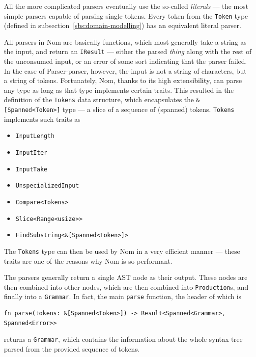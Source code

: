 \documentclass[english,engineering]{wizthesis}
\newcommand{\thisproject}{Parser-parser}
\begin{document}
All the more complicated parsers eventually use the so-called \emph{literals}
--- the most simple parsers capable of parsing single tokens. Every token from
the \texttt{Token} type (defined in subsection~\ref{sbs:domain-modelling}) has
an equivalent literal parser.

All parsers in Nom are basically functions, which most generally take a string
as the input, and return an \texttt{IResult} --- either the parsed \emph{thing}
along with the rest of the unconsumed input, or an error of some sort indicating
that the parser failed. In the case of \thisproject{}, however, the input is not
a string of characters, but a string of tokens. Fortunately, Nom, thanks to its
high extensibility, can parse any type as long as that type implements certain
traits. This resulted in the definition of the \texttt{Tokens} data structure,
which encapsulates the \texttt{\&[Spanned<Token>]} type --- a slice of a sequence
of (spanned) tokens. \texttt{Tokens} implements such traits as
\begin{itemize}[noitemsep]
  \item \verb|InputLength|
  \item \verb|InputIter|
  \item \verb|InputTake|
  \item \verb|UnspecializedInput|
  \item \verb|Compare<Tokens>|
  \item \verb|Slice<Range<usize>>|
  \item \verb|FindSubstring<&[Spanned<Token>]>|
\end{itemize}
The \texttt{Tokens} type can then be used by Nom in a very efficient manner ---
these traits are one of the reasons why Nom is so performant.

The parsers generally return a single AST node as their output. These nodes are
then combined into other nodes, which are then combined into
\texttt{Production}s, and finally into a \texttt{Grammar}. In fact, the main
\texttt{parse} function, the header of which is
\begin{verbatim}
fn parse(tokens: &[Spanned<Token>]) -> Result<Spanned<Grammar>, Spanned<Error>>
\end{verbatim}
returns a \texttt{Grammar}, which contains the information about the whole
syntax tree parsed from the provided sequence of tokens.
\end{document}
